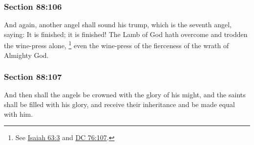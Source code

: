 
	\subsubsection{Section 88:106} %
		\label{DC88-106}

		And again, another angel shall sound his trump, which is the seventh angel, saying: It is finished; it is finished! The Lamb of God hath overcome and trodden the wine-press alone,%
			\footnote{%
				See \hyperref[ISAIAH-63-3]{Isaiah 63:3} and \hyperref[DC76-107]{DC 76:107}.
				}
		even the wine-press of the fierceness of the wrath of Almighty God.


	\subsubsection{Section 88:107} %
		\label{DC88-107}

		And then shall the angels be crowned with the glory of his might, and the saints shall be filled with his glory, and receive their inheritance and be made equal with him.


